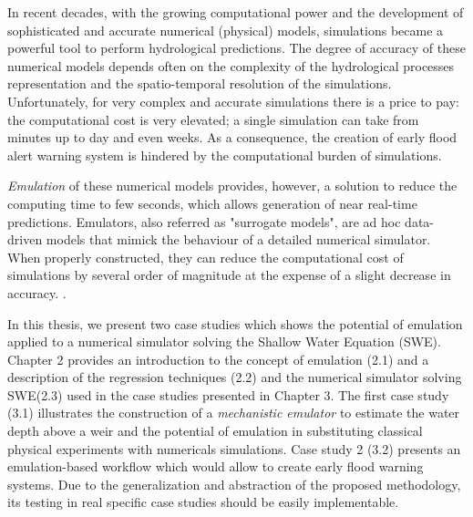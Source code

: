 In recent decades, with the growing computational power and the development of sophisticated and accurate numerical (physical) models, simulations became a powerful tool to perform hydrological predictions. 
The degree of accuracy of these numerical models depends often on the complexity of the hydrological processes representation and the spatio-temporal resolution of the simulations. Unfortunately, for very complex and accurate simulations there is a price to pay: the computational cost is very elevated; a single simulation can take from  minutes up to day and even weeks. As a consequence, the creation of early flood alert warning system is hindered by the computational burden of simulations. 

\emph{Emulation} of these numerical models provides, however, a solution to reduce the computing time to few seconds, which allows generation of near real-time predictions.
Emulators, also referred as "surrogate models", are ad hoc data-driven models that 
mimick the behaviour of a detailed numerical simulator. When properly constructed, they can reduce the computational cost of simulations by several order of magnitude at the expense of a slight decrease in accuracy. \autocite{gorissen_surrogate_2010}\autocite{carbajal_appraisal_2016}.

In this thesis, we present two case studies which shows the potential of emulation applied to a numerical simulator solving the Shallow Water Equation (SWE). 
Chapter 2 provides an introduction to the concept of emulation (2.1) and a description of the regression techniques (2.2) and the numerical simulator solving SWE(2.3) used in the case studies presented in Chapter 3.
The first case study (3.1) illustrates the construction of a \emph{mechanistic emulator} to estimate the water depth above a weir and the potential of emulation in substituting classical physical experiments with numericals simulations.  
Case study 2 (3.2) presents an emulation-based workflow which would allow to create early flood warning systems. 
Due to the generalization and abstraction of the proposed methodology, its testing in real specific case studies should be easily implementable.
 

